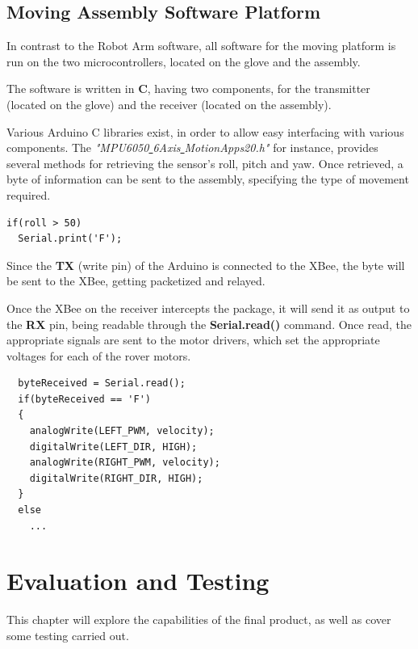 \documentclass[12p,a4paper]{report}
\begin{document}
\newpage
\section{Moving Assembly Software Platform}
In contrast to the Robot Arm software, all software for the moving platform is run on the two microcontrollers, located on the glove and the assembly.

The software is written in \textbf{C}, having two components, for the transmitter (located on the glove) and the receiver (located on the assembly).

Various Arduino C libraries exist, in order to allow easy interfacing with various components. The \emph{"MPU6050\underline{ }6Axis\underline{ }MotionApps20.h"} for instance, provides several methods for retrieving the sensor's roll, pitch and yaw. Once retrieved, a byte of information can be sent to the assembly, specifying the type of movement required.

\begin{verbatim}
if(roll > 50)
  Serial.print('F');
\end{verbatim}

Since the \textbf{TX} (write pin) of the Arduino is connected to the XBee, the byte will be sent to the XBee, getting packetized and relayed.

Once the XBee on the receiver intercepts the package, it will send it as output to the \textbf{RX} pin, being readable through the \textbf{Serial.read()} command. Once read, the appropriate signals are sent to the motor drivers, which set the appropriate voltages for each of the rover motors. 

\begin{verbatim}
  byteReceived = Serial.read();
  if(byteReceived == 'F')
  {
    analogWrite(LEFT_PWM, velocity);  
    digitalWrite(LEFT_DIR, HIGH);
    analogWrite(RIGHT_PWM, velocity);  
    digitalWrite(RIGHT_DIR, HIGH);    
  }
  else
    ...
\end{verbatim}
\chapter{Evaluation and Testing}
This chapter will explore the capabilities of the final product, as well as cover some testing carried out.
\end{document}
